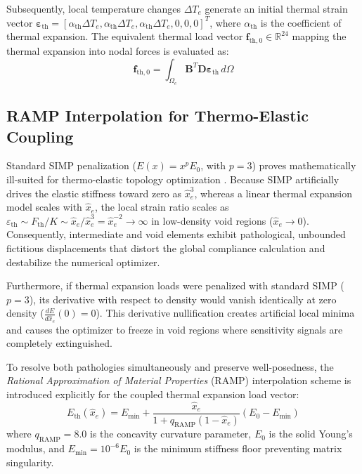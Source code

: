 \documentclass[11pt, a4paper]{article}
\begin{document}
Subsequently, local temperature changes $\Delta T_e$ generate an initial thermal strain vector $\boldsymbol{\varepsilon}_{\text{th}} = [\alpha_{\text{th}}\Delta T_e, \alpha_{\text{th}}\Delta T_e, \alpha_{\text{th}}\Delta T_e, 0, 0, 0]^T$, where $\alpha_{\text{th}}$ is the coefficient of thermal expansion. The equivalent thermal load vector $\mathbf{f}_{\text{th},0} \in \mathbb{R}^{24}$ mapping the thermal expansion into nodal forces is evaluated as:
\begin{equation}
\mathbf{f}_{\text{th},0} = \int_{\Omega_e} \mathbf{B}^T \mathbf{D} \boldsymbol{\varepsilon}_{\text{th}} \, d\Omega
\end{equation}

\subsection{RAMP Interpolation for Thermo-Elastic Coupling}
\label{sec:ramp}
Standard SIMP penalization ($E(x) = x^p E_0$, with $p=3$) proves mathematically ill-suited for thermo-elastic topology optimization \cite{pedersen2010, rodrigues1995}. Because SIMP artificially drives the elastic stiffness toward zero as $\hat{x}_e^3$, whereas a linear thermal expansion model scales with $\hat{x}_e$, the local strain ratio scales as $\varepsilon_{\text{th}} \sim F_{\text{th}} / K \sim \hat{x}_e / \hat{x}_e^3 = \hat{x}_e^{-2} \to \infty$ in low-density void regions ($\hat{x}_e \to 0$). Consequently, intermediate and void elements exhibit pathological, unbounded fictitious displacements that distort the global compliance calculation and destabilize the numerical optimizer.

Furthermore, if thermal expansion loads were penalized with standard SIMP ($p=3$), its derivative with respect to density would vanish identically at zero density ($\frac{dE}{d\hat{x}_e}(0) = 0$). This derivative nullification creates artificial local minima and causes the optimizer to freeze in void regions where sensitivity signals are completely extinguished.

To resolve both pathologies simultaneously and preserve well-posedness, the \textit{Rational Approximation of Material Properties} (RAMP) interpolation scheme \cite{bendsoe2003, pedersen2010} is introduced explicitly for the coupled thermal expansion load vector:
\begin{equation}
E_{\text{th}}(\hat{x}_e) = E_{\min} + \frac{\hat{x}_e}{1 + q_{\text{RAMP}} (1 - \hat{x}_e)} (E_0 - E_{\min})
\end{equation}
where $q_{\text{RAMP}} = 8.0$ is the concavity curvature parameter, $E_0$ is the solid Young's modulus, and $E_{\min} = 10^{-6} E_0$ is the minimum stiffness floor preventing matrix singularity.
\end{document}
